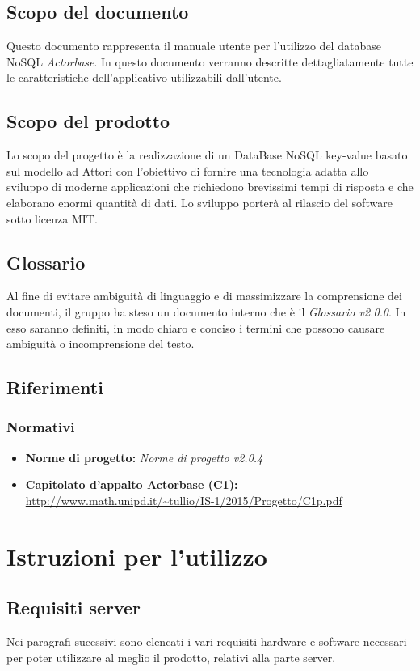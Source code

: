 \documentclass[a4paper]{article}
\begin{document}
	\subsection{Scopo del documento}
		Questo documento rappresenta il manuale utente per l'utilizzo del database NoSQL \emph{Actorbase}. In questo documento verranno descritte dettagliatamente tutte le caratteristiche dell’applicativo utilizzabili dall’utente.
	\subsection{Scopo del prodotto}
		Lo scopo del progetto è la realizzazione di un DataBase NoSQL key-value basato sul modello ad 
		Attori con l'obiettivo di fornire una tecnologia adatta allo sviluppo di moderne 
		applicazioni che richiedono brevissimi tempi di risposta e che elaborano enormi quantità 
		di dati. Lo sviluppo porterà al rilascio del software sotto licenza MIT.
	\subsection{Glossario}
		Al fine di evitare ambiguità di linguaggio e di massimizzare la comprensione dei documenti, il 
      gruppo ha steso un documento interno che è il \emph{Glossario v2.0.0}. In esso saranno definiti, in modo
      chiaro e conciso i termini che possono causare ambiguità o incomprensione del testo.
	\subsection{Riferimenti}
	\subsubsection{Normativi}
		\begin{itemize}
			\item \textbf{Norme di progetto:} \emph{Norme di progetto v2.0.4}
			\item \textbf{Capitolato d'appalto Actorbase (C1):} \\ 
			\url{http://www.math.unipd.it/~tullio/IS-1/2015/Progetto/C1p.pdf}
		\end{itemize}
	
	\newpage
	\section{Istruzioni per l'utilizzo}		
		\subsection{Requisiti server}
			Nei paragrafi sucessivi sono elencati i vari requisiti hardware e software necessari per poter utilizzare al meglio il prodotto, relativi alla parte server.
\end{document}
